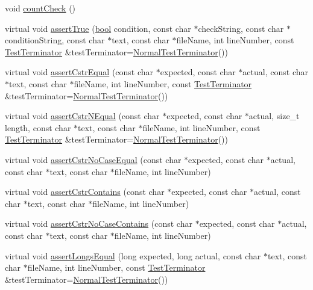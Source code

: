 \begin{DoxyCompactItemize}
\item 
void \hyperlink{class_utest_shell_a58577489a2418efb4c440761e533f2e7}{count\+Check} ()
\item 
virtual void \hyperlink{class_utest_shell_ae94c3261aae58fd432f56530ed93fac0}{assert\+True} (\hyperlink{avb__gptp_8h_af6a258d8f3ee5206d682d799316314b1}{bool} condition, const char $\ast$check\+String, const char $\ast$condition\+String, const char $\ast$text, const char $\ast$file\+Name, int line\+Number, const \hyperlink{class_test_terminator}{Test\+Terminator} \&test\+Terminator=\hyperlink{class_normal_test_terminator}{Normal\+Test\+Terminator}())
\item 
virtual void \hyperlink{class_utest_shell_aabd5eeb6ba32e6101c0ec8e058a2518c}{assert\+Cstr\+Equal} (const char $\ast$expected, const char $\ast$actual, const char $\ast$text, const char $\ast$file\+Name, int line\+Number, const \hyperlink{class_test_terminator}{Test\+Terminator} \&test\+Terminator=\hyperlink{class_normal_test_terminator}{Normal\+Test\+Terminator}())
\item 
virtual void \hyperlink{class_utest_shell_a14fdfe6489e95bf228cdb05b3d41d9c3}{assert\+Cstr\+N\+Equal} (const char $\ast$expected, const char $\ast$actual, size\+\_\+t length, const char $\ast$text, const char $\ast$file\+Name, int line\+Number, const \hyperlink{class_test_terminator}{Test\+Terminator} \&test\+Terminator=\hyperlink{class_normal_test_terminator}{Normal\+Test\+Terminator}())
\item 
virtual void \hyperlink{class_utest_shell_ac9d08e315dbe87ee9286acabe85b51da}{assert\+Cstr\+No\+Case\+Equal} (const char $\ast$expected, const char $\ast$actual, const char $\ast$text, const char $\ast$file\+Name, int line\+Number)
\item 
virtual void \hyperlink{class_utest_shell_a02142e9582af1a9e622200fe46a3a15f}{assert\+Cstr\+Contains} (const char $\ast$expected, const char $\ast$actual, const char $\ast$text, const char $\ast$file\+Name, int line\+Number)
\item 
virtual void \hyperlink{class_utest_shell_afca15ab751bda33d3784efe4b06bf875}{assert\+Cstr\+No\+Case\+Contains} (const char $\ast$expected, const char $\ast$actual, const char $\ast$text, const char $\ast$file\+Name, int line\+Number)
\item 
virtual void \hyperlink{class_utest_shell_aa9675257925548a20a426cc32c6883c5}{assert\+Longs\+Equal} (long expected, long actual, const char $\ast$text, const char $\ast$file\+Name, int line\+Number, const \hyperlink{class_test_terminator}{Test\+Terminator} \&test\+Terminator=\hyperlink{class_normal_test_terminator}{Normal\+Test\+Terminator}())

\end{DoxyCompactItemize}
